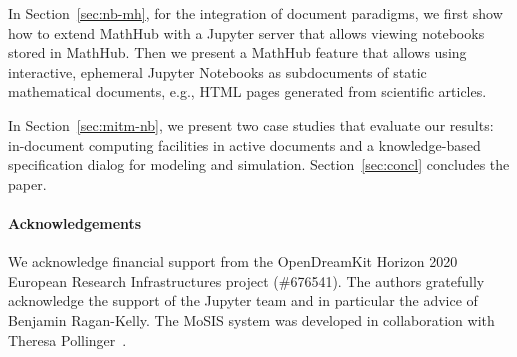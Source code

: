 In Section~\ref{sec:nb-mh}, for the integration of document paradigms, we first show how to extend MathHub with a Jupyter server that allows viewing notebooks stored in MathHub.
Then we present a MathHub feature that allows using interactive, ephemeral Jupyter Notebooks as subdocuments of static mathematical documents, e.g., HTML pages generated from scientific articles.

In Section~\ref{sec:mitm-nb}, we present two case studies that evaluate our results: in-document computing facilities in active documents and a knowledge-based specification dialog for modeling and simulation.
Section~\ref{sec:concl} concludes the paper.

\paragraph{Acknowledgements}
We acknowledge financial support from the OpenDreamKit Horizon 2020 European Research Infrastructures project (\#676541).
The authors gratefully acknowledge the support of the Jupyter team and in particular the advice of Benjamin Ragan-Kelly.
The MoSIS system was developed in collaboration with Theresa Pollinger~\cite{PolKohKoe:kacse18}.

